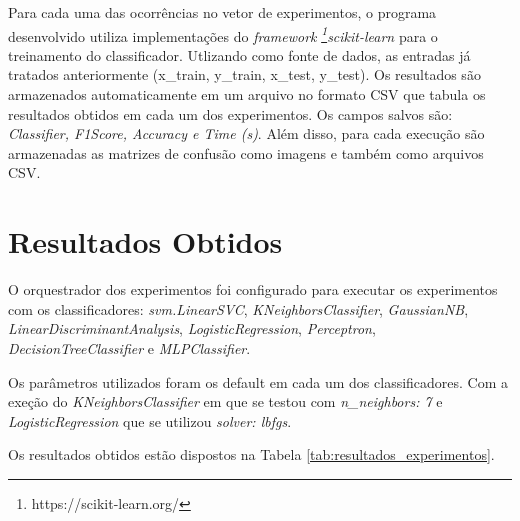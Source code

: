 \documentclass[conference]{IEEEtran}
\begin{document}
Para cada uma das ocorrências no vetor de experimentos, o programa desenvolvido utiliza implementações do \textit{framework} \textit{\footnote{https://scikit-learn.org/}scikit-learn} para o treinamento do classificador. Utlizando como fonte de dados, as entradas já tratados anteriormente (x\_train, y\_train, x\_test, y\_test). Os resultados são armazenados automaticamente em um arquivo no formato CSV que tabula os resultados obtidos em cada um dos experimentos. Os campos salvos são: \textit{Classifier, F1Score, Accuracy e Time (s)}. Além disso, para cada execução são armazenadas as matrizes de confusão como imagens e também como arquivos CSV.

\section{Resultados Obtidos}

O orquestrador dos experimentos foi configurado para executar os experimentos com os classificadores: \textit{svm.LinearSVC}, \textit{KNeighborsClassifier}, \textit{GaussianNB}, \textit{LinearDiscriminantAnalysis}, \textit{LogisticRegression}, \textit{Perceptron}, \textit{DecisionTreeClassifier} e \textit{MLPClassifier}.

Os parâmetros utilizados foram os default em cada um dos classificadores. Com a exeção do \textit{KNeighborsClassifier} em que se testou com \textit{n\_neighbors: 7} e \textit{LogisticRegression} que se utilizou \textit{solver: lbfgs}.

Os resultados obtidos estão dispostos na Tabela \ref{tab:resultados_experimentos}.
\end{document}
